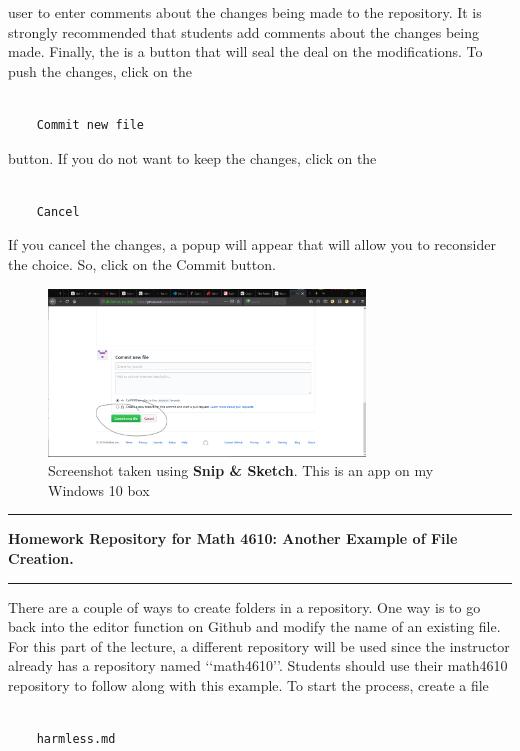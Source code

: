 \documentclass[10pt,fleqn]{article}
\begin{document}
user to enter comments about the changes being made to the repository. It is
strongly recommended that students add comments about the changes being made.
Finally, the is a button that will seal the deal on the modifications. To
push the changes, click on the
\begin{verbatim}

    Commit new file

\end{verbatim}
button. If you do not want to keep the changes, click on the
\begin{verbatim}

    Cancel

\end{verbatim}
If you cancel the changes, a popup will appear that will allow you to reconsider
the choice. So, click on the Commit button.
\vfill
\begin{figure}[h]
\centering
\includegraphics[width=0.75\textwidth]{../images/github_07.png}
\caption{{Screenshot} taken using {\bf Snip \& Sketch}. This is an app on
         my Windows 10 box}
\end{figure}
\eject
\vskip0.1in\hrule\vskip0.1in
\noindent
{\bf Homework Repository for Math 4610: Another Example of File Creation.} 
\vskip0.1in\hrule\vskip0.1in
There are a couple of ways to create folders in a repository. One way is to go
back into the editor function on Github and modify the name of an existing file.
For this part of the lecture, a different repository will be used since the
instructor already has a repository named \lq\lq math4610\rq\rq. Students should
use their math4610 repository to follow along with this example. To start the
process, create a file
\begin{verbatim}

    harmless.md

\end{verbatim}
\end{document}
